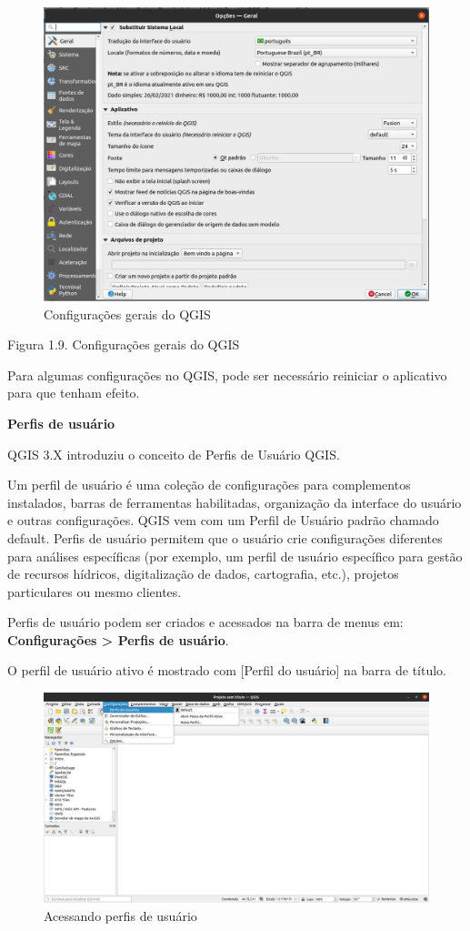 \documentclass[
  portuguese,
]{krantz}
\begin{document}
\begin{figure}
\centering
\includegraphics{media/modulo1/change-theme.png}
\caption{Configurações gerais do QGIS}
\end{figure}

Figura 1.9. Configurações gerais do QGIS

Para algumas configurações no QGIS, pode ser necessário reiniciar o aplicativo para que tenham efeito.

\textbf{Perfis de usuário}

QGIS 3.X introduziu o conceito de Perfis de Usuário QGIS.

Um perfil de usuário é uma coleção de configurações para complementos instalados, barras de ferramentas habilitadas, organização da interface do usuário e outras configurações. QGIS vem com um Perfil de Usuário padrão chamado default. Perfis de usuário permitem que o usuário crie configurações diferentes para análises específicas (por exemplo, um perfil de usuário específico para gestão de recursos hídricos, digitalização de dados, cartografia, etc.), projetos particulares ou mesmo clientes.

Perfis de usuário podem ser criados e acessados na barra de menus em: \textbf{Configurações \textgreater{} Perfis de usuário}.

O perfil de usuário ativo é mostrado com {[}Perfil do usuário{]} na barra de título.

\begin{figure}
\centering
\includegraphics{media/modulo1/user-profiles-1.png}
\caption{Acessando perfis de usuário}
\end{figure}
\end{document}
